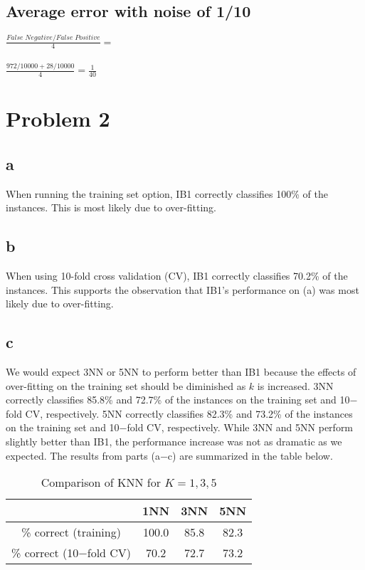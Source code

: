 \documentclass{article}
\begin{document}
\subsection*{Average error with noise of 1/10}
$\frac{False \;Negative/False \;Positive}{4} =$\\\\
$ \frac{972/10000 + 28/10000}{4}  = \frac{1}{40}$



\section*{Problem 2}
\subsection*{a}
When running the training set option, IB1 correctly classifies 100\% of the instances. This is most likely due to over-fitting.\\

\subsection*{b} 
When using 10-fold cross validation (CV), IB1 correctly classifies 70.2\% of the instances. This supports the observation that IB1\rq{}s performance on (a) was most likely due to over-fitting.\\

\subsection*{c}
We would expect 3NN or 5NN to perform better than IB1 because the effects of over-fitting on the training set should be diminished as $k$ is increased. 3NN correctly classifies 85.8\% and 72.7\% of the instances on the training set and 10$-$fold CV, respectively. 5NN correctly classifies 82.3\% and 73.2\% of the instances on the training set and 10$-$fold CV, respectively. While 3NN and 5NN perform slightly better than IB1, the performance increase was not as dramatic as we expected. The results from parts (a$-$c) are summarized in the table below.\\

\begin{table}[ht]
\caption{Comparison of KNN for $ K = 1,3,5$}
\centering
\begin{tabular}{c c c c}
\hline\hline
 & 1NN & 3NN & 5NN\\ [0.5ex]
\hline
\% correct (training) & 100.0 & 85.8 & 82.3 \\ 
\% correct (10$-$fold CV) & 70.2 & 72.7 & 73.2 \\
\hline
\end{tabular}
\label{table:table2c} 
\end{table}
\end{document}
